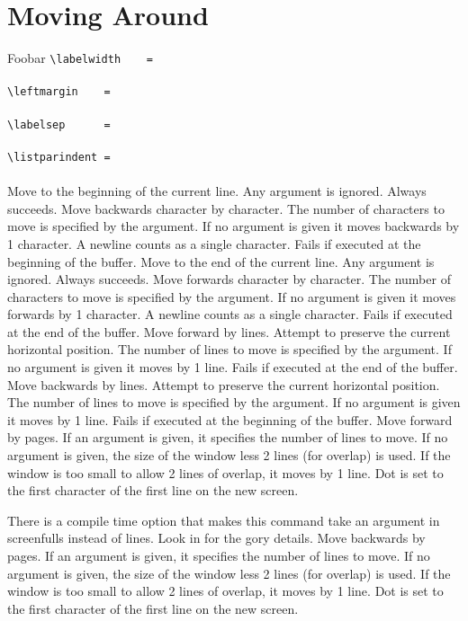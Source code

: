 \section{Moving Around}
\begin{cmdlist}
 \item[Foobar]
 \verb+\labelwidth    = + \\
	\framebox[\labelwidth]{*}	\\
 \verb+\leftmargin    = + \\
	\framebox[\leftmargin]{*}	\\
 \verb+\labelsep      = + \\
	\framebox[\labelsep]{*}	\\
 \verb+\listparindent = + \\
	\framebox[\listparindent]{*}	\\

Move to the beginning of the current line. Any argument
is ignored. Always succeeds.
Move backwards character by character. The number of characters
to move is specified by the argument. If no argument is given it moves
backwards by 1 character. A newline counts as a single character. Fails
if executed at the beginning of the buffer.
Move to the end of the current line. Any argument is ignored.
Always succeeds.
Move forwards character by character. The number of characters
to move is specified by the argument. If no argument is given it moves
forwards by 1 character. A newline counts as a single character. Fails
if executed at the end of the buffer.
Move forward by lines. Attempt to preserve the current horizontal
position. The number of lines to move is specified by the argument. If no
argument is given it moves by 1 line. Fails if executed at the end of the
buffer.
Move backwards by lines. Attempt to preserve the current horizontal
position. The number of lines to move is specified by the argument. If no
argument is given it moves by 1 line. Fails if executed at the beginning of
the buffer.
Move forward by pages. If an argument is given, it specifies the
number of lines to move. If no argument is given, the size of the window
less 2 lines (for overlap) is used. If the window is too small to allow
2 lines of overlap, it moves by 1 line. Dot is set to the first character
of the first line on the new screen.

There is a compile time option that makes this command take an argument
in screenfulls instead of lines. Look in  for the gory details.
Move backwards by pages. If an argument is given, it specifies
the number of lines to move. If no argument is given, the size of the window
less 2 lines (for overlap) is used. If the window is too small to allow
2 lines of overlap, it moves by 1 line. Dot is set to the first character
of the first line on the new screen.


\end{cmdlist}
